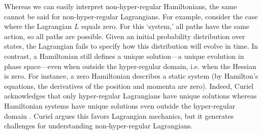 \documentclass[12pt, english, twoside]{article} %
\begin{document}
Whereas we can easily interpret non-hyper-regular Hamiltonians, the same cannot be said for non-hyper-regular Lagrangians. For example, consider the case where the Lagrangian $L$ equals zero. For this `system,' all paths have the same action, so all paths are possible. Given an initial probability distribution over states, the Lagrangian fails to specify how this distribution will evolve in time. In contrast, a Hamiltonian still defines a unique solution---a unique evolution in phase space---even when outside the hyper-regular domain, i.e. when the Hessian is zero. For instance, a zero Hamiltonian describes a static system (by Hamilton's equations, the derivatives of the position and momenta are zero). Indeed, Curiel acknowledges that only hyper-regular Lagrangians have unique solutions whereas Hamiltonian systems have unique solutions even outside the hyper-regular domain \parencites*[291, 308]{Curiel}. Curiel argues this favors Lagrangian mechanics, but it generates challenges for understanding non-hyper-regular Lagrangians.
\end{document}

